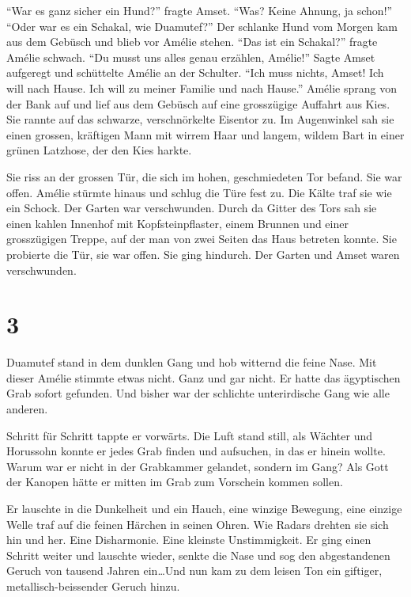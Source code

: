 \documentclass[11pt,titlepage,a5paper]{book}
\begin{document}
"`War es ganz sicher ein Hund?"' fragte Amset. "`Was? Keine Ahnung, ja schon!"' "`Oder war es ein Schakal, wie Duamutef?"' Der schlanke Hund vom Morgen kam aus dem Gebüsch und blieb vor Amélie stehen. "`Das ist ein Schakal?"' fragte Amélie schwach. "`Du musst uns alles genau erzählen, Amélie!"' Sagte Amset aufgeregt und schüttelte Amélie an der Schulter. "`Ich muss nichts, Amset! Ich will nach Hause. Ich will zu meiner Familie und nach Hause."' Amélie sprang von der Bank auf und lief aus dem Gebüsch auf eine grosszügige Auffahrt aus Kies. Sie rannte auf das schwarze, verschnörkelte Eisentor zu. Im Augenwinkel sah sie einen grossen, kräftigen Mann mit wirrem Haar und langem, wildem Bart in einer grünen Latzhose, der den Kies harkte.

Sie riss an der grossen Tür, die sich im hohen, geschmiedeten Tor befand. Sie war offen. Amélie stürmte hinaus und schlug die Türe fest zu. Die Kälte traf sie wie ein Schock. Der Garten war verschwunden. Durch da Gitter des Tors sah sie einen kahlen Innenhof mit Kopfsteinpflaster, einem Brunnen und einer grosszügigen Treppe, auf der man von zwei Seiten das Haus betreten konnte. Sie probierte die Tür, sie war offen. Sie ging hindurch. Der Garten und Amset waren verschwunden.

\section*{3}


Duamutef stand in dem dunklen Gang und hob witternd die feine Nase. Mit dieser Amélie stimmte etwas nicht. Ganz und gar nicht. Er hatte das ägyptischen Grab sofort gefunden. Und bisher war der schlichte unterirdische Gang wie alle anderen. 

Schritt für Schritt tappte er vorwärts. Die Luft stand still, als Wächter und Horussohn konnte er jedes Grab finden und aufsuchen, in das er hinein wollte. Warum war er nicht in der Grabkammer gelandet, sondern im Gang? Als Gott der Kanopen hätte er mitten im Grab zum Vorschein kommen sollen. 

Er lauschte in die Dunkelheit und ein Hauch, eine winzige Bewegung, eine einzige Welle traf auf die feinen Härchen in seinen Ohren. Wie Radars drehten sie sich hin und her. Eine Disharmonie. Eine kleinste Unstimmigkeit. Er ging einen Schritt weiter und lauschte wieder, senkte die Nase und sog den abgestandenen Geruch von tausend Jahren ein\dots Und nun kam zu dem leisen Ton ein giftiger, metallisch-beissender Geruch hinzu. 
\end{document}
